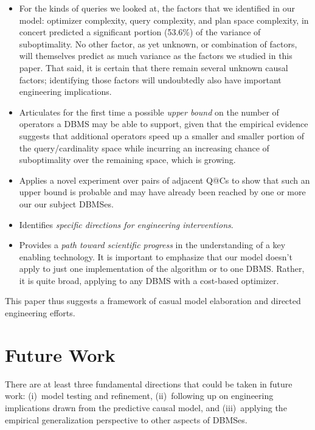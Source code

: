 \documentclass[prodmode,acmtods]{acmsmall}
\begin{document}
\begin{itemize}
\item For the kinds of queries we looked at, the factors that we
identified in our model: optimizer complexity, query complexity, and plan
space complexity, in concert predicted a significant portion (53.6\%) of the variance
of suboptimality.  No other factor, as yet unknown, or combination of factors,
will themselves predict as much variance as the factors we studied in this
paper. That said, it is certain that there remain several unknown causal factors;
identifying those factors will undoubtedly also have important engineering
implications.

\item Articulates for the first time a possible {\em upper bound} on the
  number of operators a \hbox{DBMS} may be able to support, given that the
  empirical evidence suggests that additional operators speed up a smaller
  and smaller portion of the query/cardinality space while incurring an
  increasing chance of suboptimality over the remaining space, which is
  growing.

\item Applies a novel experiment over pairs of adjacent Q@Cs to show that
  such an upper bound is probable and may have already been reached by one
  or more our our subject DBMSes.

\item Identifies {\em specific directions for engineering interventions}.

\item Provides a {\em path toward scientific progress} in the
  understanding of a key enabling technology. 
  It is important to emphasize that our model doesn't apply to just one implementation of the
algorithm or to one \hbox{DBMS}.  Rather, it is quite broad, applying to any \hbox{DBMS}
with a cost-based optimizer.

\end{itemize}
This paper thus suggests a framework of casual model elaboration and
directed engineering efforts.

\section{Future Work}\label{sec:future}
There are at least three fundamental directions that could be taken in
future work: (i)~model testing and refinement, (ii)~following up on engineering
implications drawn from the predictive causal model, and (iii)~applying the empirical
generalization perspective to other aspects of DBMSes.
\end{document}
